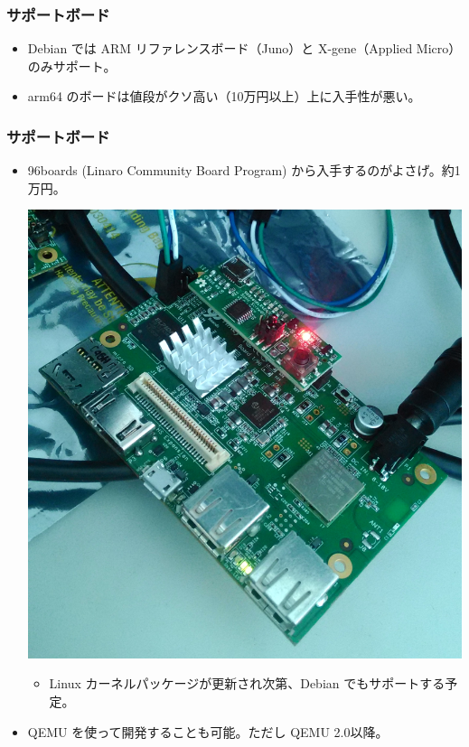 \documentclass[cjk,dvipdfmx,10pt,compress,%
hyperref={bookmarks=true,bookmarksnumbered=true,bookmarksopen=false,%
colorlinks=false,%
pdftitle={第 103 回 関西 Debian 勉強会},%
pdfauthor={岩松 信洋},%
pdfsubject={資料},%
}]{beamer}
\begin{document}
\begin{frame}[fragile]
  \frametitle{サポートボード}
  \begin{itemize}
  \item Debian では ARM リファレンスボード（Juno）と X-gene（Applied Micro）のみサポート。
  \item arm64 のボードは値段がクソ高い（10万円以上）上に入手性が悪い。
  
  \end{itemize}

\end{frame}
\begin{frame}[fragile]
  \frametitle{サポートボード}
  \begin{itemize}
    \item 96boards (Linaro Community Board Program) から入手するのがよさげ。約1万円。
    \begin{center}
    \includegraphics[width=0.3\hsize]{image201511/hikey.png}
    \end{center}
    \begin{itemize}
    \item Linux カーネルパッケージが更新され次第、Debian でもサポートする予定。
    \end{itemize}
  \item QEMU を使って開発することも可能。ただし QEMU 2.0以降。
  \end{itemize}
\end{frame}
\end{document}
